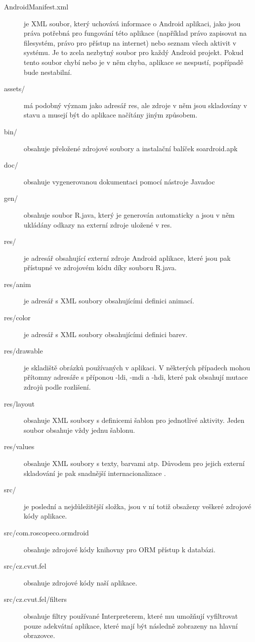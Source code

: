 \documentclass[thesis=M,czech]{FITthesis}[2012/06/26]
\begin{document}
\begin{description}
\item[AndroidManifest.xml] je XML soubor, který uchovává informace o Android aplikaci, jako jsou práva potřebná pro fungování této aplikace (například právo zapisovat na filesystém, právo pro přístup na internet) nebo seznam všech aktivit v systému. Je to zcela nezbytný soubor pro každý Android projekt. Pokud tento soubor chybí nebo je v něm chyba, aplikace se nespustí, popřípadě bude nestabilní.
\item[assets/] má podobný význam jako adresář res, ale zdroje v něm jsou skladovány v  stavu a musejí být do aplikace načítány jiným způsobem.
\item[bin/] obsahuje přeložené zdrojové soubory a instalační balíček soardroid.apk
\item[doc/] obsahuje vygenerovanou dokumentaci pomocí nástroje Javadoc
\item[gen/] obsahuje soubor R.java, který je generován automaticky a jsou v něm ukládány odkazy na externí zdroje uložené v res.
\item[res/] je adresář obsahující externí zdroje Android aplikace, které jsou pak přístupné ve zdrojovém kódu díky souboru R.java.
\item[res/anim] je adresář s XML soubory obsahujícími definici animací.
\item[res/color] je adresář s XML soubory obsahujícími definici barev.
\item[res/drawable] je skladiště obrázků používaných v aplikaci. V některých případech mohou přítomny adresáře s příponou -ldi, -mdi a -hdi, které pak obsahují mutace zdrojů podle rozlišení.
\item[res/layout] obsahuje XML soubory s definicemi šablon pro jednotlivé aktivity. Jeden soubor obsahuje vždy jednu šablonu.
\item[res/values] obsahuje XML soubory s texty, barvami atp. Důvodem pro jejich externí skladování je pak snadnější internacionalizace \cite{android_i18n}.
\item[src/] je poslední a nejdůležitější složka, jsou v ní totiž obsaženy veškeré zdrojové kódy aplikace.
\item[src/com.roscopeco.ormdroid] obsahuje zdrojové kódy knihovny pro ORM přístup k databázi.
\item[src/cz.cvut.fel] obsahuje zdrojové kódy naší aplikace.
\item[src/cz.cvut.fel/filters] obsahuje filtry používané Interpreterem, které mu umožňují vyfiltrovat pouze adekvátní aplikace, které mají být následně zobrazeny na hlavní obrazovce.

\end{description}
\end{document}
